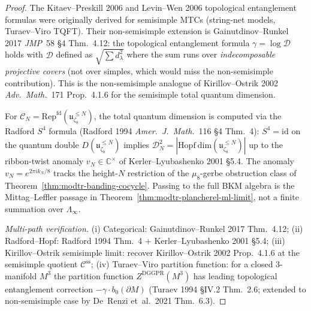 \begin{proof}
The Kitaev--Preskill 2006 and Levin--Wen 2006 topological entanglement
formulas were originally derived for semisimple MTCs (string-net
models, Turaev--Viro TQFT). Their non-semisimple extension is
Gainutdinov--Runkel 2017 \emph{JMP}~58 \S 4 Thm.~4.12: the topological
entanglement formula $\gamma = \log\mathcal D$ holds with $\mathcal D$
defined as $\sqrt{\sum d_\lambda^2}$ where the sum runs over
\emph{indecomposable projective covers} (not over simples, which would
miss the non-semisimple contribution). This is the non-semisimple analogue
of Kirillov--Ostrik 2002 \emph{Adv.\ Math.}~171 Prop.~4.1.6 for the
semisimple total quantum dimension.

For
\(\mathcal C_N = \mathrm{Rep}^{\mathrm{fd}}(\mathfrak u_{\zeta_8}^{\leq N})\),
the total quantum dimension is computed via the Radford $S^4$ formula
(Radford 1994 \emph{Amer.\ J.\ Math.}~116 \S 4 Thm.~4):
\(S^4 = \mathrm{id}\) on the quantum double
\(D(\mathfrak u_{\zeta_8}^{\leq N})\) implies
\(\mathcal D_N^2 =
|\mathrm{Hopf\ dim}(\mathfrak u_{\zeta_8}^{\leq N})|\) up to the
ribbon-twist anomaly \(v_N\in\mathbb C^\times\) of
Kerler--Lyubashenko 2001 \S 5.4. The anomaly \(v_N = e^{2\pi i k_N/8}\)
tracks the height-\(N\) restriction of the $\mu_8$-gerbe obstruction
class of Theorem~\ref{thm:modtr-banding-cocycle}. Passing to the
full BKM algebra is the Mittag--Leffler passage in
Theorem~\ref{thm:modtr-plancherel-ml-limit}, not a finite summation over
\(\Lambda_\infty\).

\emph{Multi-path verification.}
(i) Categorical: Gainutdinov--Runkel 2017 Thm.~4.12;
(ii) Radford--Hopf: Radford 1994 Thm.~4 + Kerler--Lyubashenko 2001
\S 5.4;
(iii) Kirillov--Ostrik semisimple limit: recover Kirillov--Ostrik 2002
Prop.~4.1.6 at the semisimple quotient $\mathcal C^{\mathrm{ss}}$;
(iv) Turaev--Viro partition function: for a closed 3-manifold $M^3$
the partition function $Z^{\mathrm{DGGPR}}(M^3)$ has leading topological
entanglement correction $-\gamma\cdot b_0(\partial M)$
(Turaev 1994 \S IV.2 Thm.~2.6; extended to non-semisimple case by
De~Renzi et~al.\ 2021 Thm.~6.3).
\end{proof}

